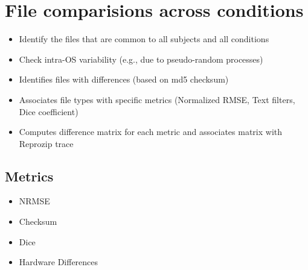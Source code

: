 \section{File comparisions across conditions}

\begin{itemize}
 \item Identify the files that are common to all subjects and all conditions
 \item Check intra-OS variability (e.g., due to pseudo-random processes)
 \item Identifies files with differences (based on md5 checksum)
 \item Associates file types with specific metrics (Normalized RMSE, Text filters, Dice coefficient)
 \item Computes difference matrix for each metric and associates matrix with Reprozip trace
\end{itemize}

\subsection{Metrics}

\begin{itemize}
\item NRMSE
\item Checksum
\item Dice
\item Hardware Differences
\end{itemize}
